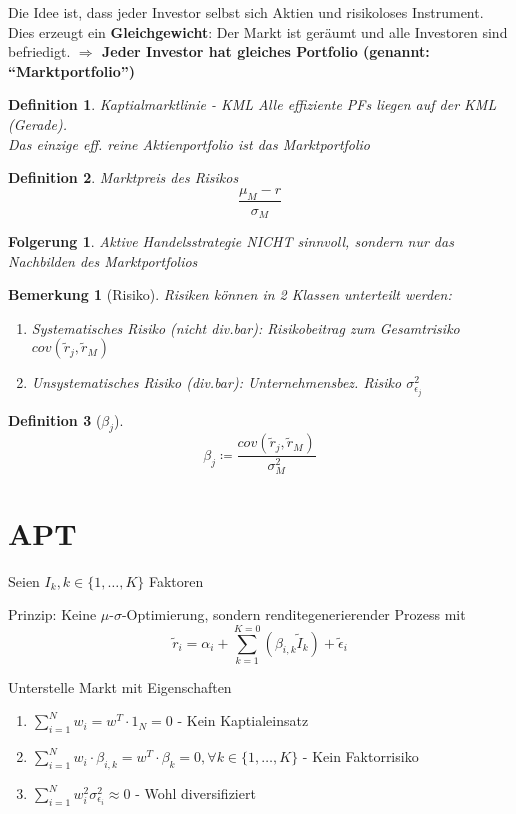 \documentclass[a4paper]{article}
\theoremstyle{break}
\newcommand{\ms}{$\mu$-$\sigma$}
\newtheorem{defi}{Definition}[section]
\newtheorem{ann}{Bemerkung}[section]
\newtheorem{der}{Folgerung}[section]
\begin{document}
Die Idee ist, dass jeder Investor selbst sich Aktien und risikoloses Instrument. Dies erzeugt ein \textbf{Gleichgewicht}: Der Markt ist geräumt und alle Investoren sind befriedigt. \textbf{$\Longrightarrow$ Jeder Investor hat gleiches Portfolio (genannt: ``Marktportfolio'')}

\begin{defi}{Kaptialmarktlinie - KML}
    Alle effiziente PFs liegen auf der KML (Gerade).\\
    Das einzige eff. reine Aktienportfolio ist das Marktportfolio
\end{defi}

\begin{defi}{Marktpreis des Risikos}
    $$\frac{\mu_M - r}{\sigma_M}$$
\end{defi}

\begin{der}
    Aktive Handelsstrategie NICHT sinnvoll, sondern nur das Nachbilden des Marktportfolios    
\end{der}

\begin{ann}[Risiko]
    Risiken können in 2 Klassen unterteilt werden:\\
   \begin{enumerate}
       \item Systematisches Risiko (nicht div.bar): Risikobeitrag zum Gesamtrisiko $cov(\tilde{r}_j, \tilde{r}_M)$
       \item Unsystematisches Risiko (div.bar): Unternehmensbez. Risiko $\sigma^{2}_{\epsilon_j}$
   \end{enumerate}    
\end{ann}

\begin{defi}[$\beta_j$]
    $$\beta_j \coloneqq \frac{cov(\tilde{r}_j, \tilde{r}_M)}{\sigma^{2}_M}$$
\end{defi}

\section{APT}

Seien $I_k, k \in \{1, \dots, K\}$ Faktoren

Prinzip: Keine \ms-Optimierung, sondern renditegenerierender Prozess mit
$$\tilde{r}_i = \alpha_i + \sum_{k=1}^{K=0} (\beta_{i,k}\tilde{I}_k)+ \tilde{\epsilon}_i$$

Unterstelle Markt mit Eigenschaften
\begin{enumerate}
   \item $\sum_{i=1}^{N} w_i = w^T \cdot 1_{N} = 0$ - Kein Kaptialeinsatz
   \item $\sum_{i=1}^{N} w_i \cdot \beta_{i,k} = w^T \cdot \beta_k = 0, \forall k \in \{1, \dots, K\}$ - Kein Faktorrisiko
   \item $\sum_{i=1}^{N} w^{2}_i \sigma^{2}_{\epsilon_i} \approx 0$ - Wohl diversifiziert
\end{enumerate}
\end{document}

